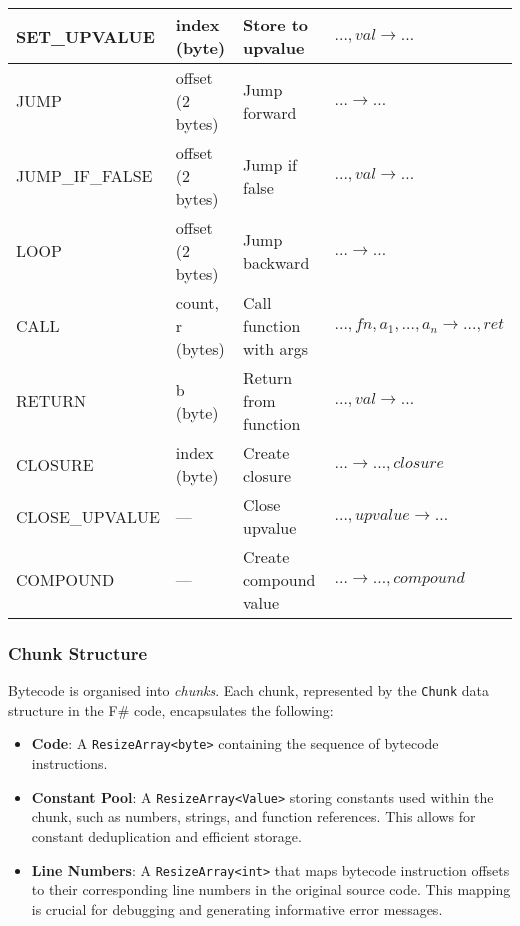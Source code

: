 \begin{table}[h]
\begin{tabularx}{\textwidth}{|X|X|X|X|}
        \hline
        SET\_UPVALUE & index (byte) & Store to upvalue & $\dots, val \rightarrow \dots$ \\
        \hline
        JUMP & offset (2 bytes) & Jump forward & $\dots \rightarrow \dots$ \\
        \hline
        JUMP\_IF\_FALSE & offset (2 bytes) & Jump if false & $\dots, val \rightarrow \dots$ \\
        \hline
        LOOP & offset (2 bytes) & Jump backward & $\dots \rightarrow \dots$ \\
        \hline
        CALL & count, r (bytes) & Call function with args & $\dots, fn, a_1, \dots, a_n \rightarrow \dots, ret$ \\
        \hline
        RETURN & b (byte) & Return from function & $\dots, val \rightarrow \dots$ \\
        \hline
        CLOSURE & index (byte) & Create closure & $\dots \rightarrow \dots, closure$ \\
        \hline
        CLOSE\_UPVALUE & --- & Close upvalue & $\dots, upvalue \rightarrow \dots$ \\
        \hline
        COMPOUND & --- & Create compound value & $\dots \rightarrow \dots, compound$ \\
        \hline
    \end{tabularx}
    \label{tab:instruction-set}
\end{table}

\subsubsection{Chunk Structure}

Bytecode is organised into \textit{chunks}.
Each chunk, represented by the \texttt{Chunk} data structure in the F\# code, encapsulates the following:

\begin{itemize}
    \item \textbf{Code}: A \texttt{ResizeArray<byte>} containing the sequence of bytecode instructions.
    \item \textbf{Constant Pool}: A \texttt{ResizeArray<Value>} storing constants used within the chunk, such as numbers, strings, and function references.
    This allows for constant deduplication and efficient storage.
    \item \textbf{Line Numbers}: A \texttt{ResizeArray<int>} that maps bytecode instruction offsets to their corresponding line numbers in the original source code.
    This mapping is crucial for debugging and generating informative error messages.
\end{itemize}

